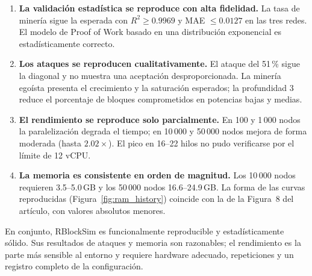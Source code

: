 \documentclass[11pt,a4paper,oneside]{article}
\begin{document}
\begin{enumerate}[leftmargin=1.4em, itemsep=3pt, topsep=4pt]
  \item \textbf{La validación estadística se reproduce con alta fidelidad.} La tasa de minería sigue la esperada con $R^2 \ge 0.9969$ y MAE $\le 0.0127$ en las tres redes. El modelo de Proof of Work basado en una distribución exponencial es estadísticamente correcto.
  \item \textbf{Los ataques se reproducen cualitativamente.} El ataque del 51\,\% sigue la diagonal y no muestra una aceptación desproporcionada. La minería egoísta presenta el crecimiento y la saturación esperados; la profundidad 3 reduce el porcentaje de bloques comprometidos en potencias bajas y medias.
  \item \textbf{El rendimiento se reproduce solo parcialmente.} En 100 y 1\,000 nodos la paralelización degrada el tiempo; en 10\,000 y 50\,000 nodos mejora de forma moderada (hasta $2.02\times$). El pico en 16--22 hilos no pudo verificarse por el límite de 12 vCPU.
  \item \textbf{La memoria es consistente en orden de magnitud.} Los 10\,000 nodos requieren 3.5--5.0\,GB y los 50\,000 nodos 16.6--24.9\,GB. La forma de las curvas reproducidas (Figura~\ref{fig:ram_history}) coincide con la de la Figura~8 del artículo, con valores absolutos menores.
\end{enumerate}

En conjunto, RBlockSim es funcionalmente reproducible y estadísticamente sólido. Sus resultados de ataques y memoria son razonables; el rendimiento es la parte más sensible al entorno y requiere hardware adecuado, repeticiones y un registro completo de la configuración.

\vspace{1em}
\printbibliography[title={Referencias}]
\end{document}
